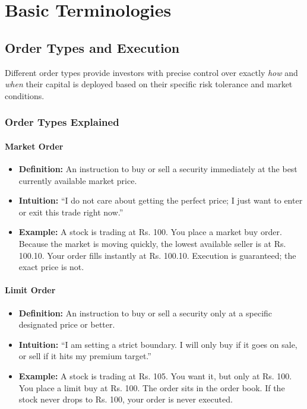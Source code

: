 \documentclass[12pt,openany]{book}
\begin{document}
\section{Basic Terminologies}

\subsection{Order Types and Execution}

Different order types provide investors with precise control over exactly \emph{how} and \emph{when} their capital is deployed based on their specific risk tolerance and market conditions.

\subsubsection{Order Types Explained}

\paragraph{Market Order}
\begin{itemize}[leftmargin=*]
    \item \textbf{Definition:} An instruction to buy or sell a security immediately at the best currently available market price.
    \item \textbf{Intuition:} ``I do not care about getting the perfect price; I just want to enter or exit this trade right now.''
    \item \textbf{Example:} A stock is trading at Rs. 100. You place a market buy order. Because the market is moving quickly, the lowest available seller is at Rs. 100.10. Your order fills instantly at Rs. 100.10. Execution is guaranteed; the exact price is not.
\end{itemize}

\paragraph{Limit Order}
\begin{itemize}[leftmargin=*]
    \item \textbf{Definition:} An instruction to buy or sell a security only at a specific designated price or better.
    \item \textbf{Intuition:} ``I am setting a strict boundary. I will only buy if it goes on sale, or sell if it hits my premium target.''
    \item \textbf{Example:} A stock is trading at Rs. 105. You want it, but only at Rs. 100. You place a limit buy at Rs. 100. The order sits in the order book. If the stock never drops to Rs. 100, your order is never executed.
\end{itemize}
\end{document}
